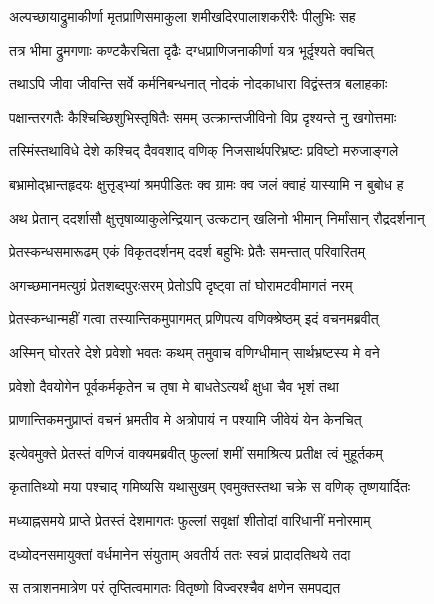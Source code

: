 \twolineshloka
{अल्पच्छायाद्रुमाकीर्णा मृतप्राणिसमाकुला}
{शमीखदिरपालाशकरीरैः पीलुभिः सह}%

\twolineshloka
{तत्र भीमा द्रुमगणाः कण्टकैरचिता दृढैः}
{दग्धप्राणिजनाकीर्णा यत्र भूर्दृश्यते क्वचित्}%

\twolineshloka
{तथाऽपि जीवा जीवन्ति सर्वे कर्मनिबन्धनात्}
{नोदकं नोदकाधारा विद्वंस्तत्र बलाहकाः}%

\twolineshloka
{पक्षान्तरगतैः कैश्चिच्छिशुभिस्तृषितैः समम्}
{उत्क्रान्तजीविनो विप्र दृश्यन्ते नु खगोत्तमाः}%

\twolineshloka
{तस्मिंस्तथाविधे देशे कश्चिद् दैववशाद् वणिक्}
{निजसार्थपरिभ्रष्टः प्रविष्टो मरुजाङ्गले}%

\twolineshloka
{बभ्रामोद्भ्रान्तहृदयः क्षुत्तृड्भ्यां श्रमपीडितः}
{क्व ग्रामः क्व जलं क्वाहं यास्यामि न बुबोध ह}%

\twolineshloka
{अथ प्रेतान् ददर्शासौ क्षुत्तृषाव्याकुलेन्द्रियान्}
{उत्कटान् खलिनो भीमान् निर्मांसान् रौद्रदर्शनान्}%

\twolineshloka
{प्रेतस्कन्धसमारूढम् एकं विकृतदर्शनम्}
{ददर्श बहुभिः प्रेतैः समन्तात् परिवारितम्}%

\twolineshloka
{अगच्छमानमत्युग्रं प्रेतशब्दपुरःसरम्}
{प्रेतोऽपि दृष्ट्वा तां घोरामटवीमागतं नरम्}%

\twolineshloka
{प्रेतस्कन्धान्महीं गत्वा तस्यान्तिकमुपागमत्}
{प्रणिपत्य वणिक्श्रेष्ठम् इदं वचनमब्रवीत्}%

\twolineshloka
{अस्मिन् घोरतरे देशे प्रवेशो भवतः कथम्}
{तमुवाच वणिग्धीमान् सार्थभ्रष्टस्य मे वने}%

\twolineshloka
{प्रवेशो दैवयोगेन पूर्वकर्मकृतेन च}
{तृषा मे बाधतेऽत्यर्थं क्षुधा चैव भृशं तथा}%

\twolineshloka
{प्राणान्तिकमनुप्राप्तं वचनं भ्रमतीव मे}
{अत्रोपायं न पश्यामि जीवेयं येन केनचित्}%

\twolineshloka
{इत्येवमुक्ते प्रेतस्तं वणिजं वाक्यमब्रवीत्}
{फुल्लां शमीं समाश्रित्य प्रतीक्ष त्वं मुहूर्तकम्}%

\twolineshloka
{कृतातिथ्यो मया पश्चाद् गमिष्यसि यथासुखम्}
{एवमुक्तस्तथा चक्रे स वणिक् तृष्णयार्दितः}%

\twolineshloka
{मध्याह्नसमये प्राप्ते प्रेतस्तं देशमागतः}
{फुल्लां सवृक्षां शीतोदां वारिधानीं मनोरमाम्}%

\twolineshloka
{दध्योदनसमायुक्तां वर्धमानेन संयुताम्}
{अवतीर्य ततः स्वन्नं प्रादादतिथये तदा}%

\twolineshloka
{स तत्राशनमात्रेण परं तृप्तित्वमागतः}
{वितृष्णो विज्वरश्चैव क्षणेन समपद्यत}%

